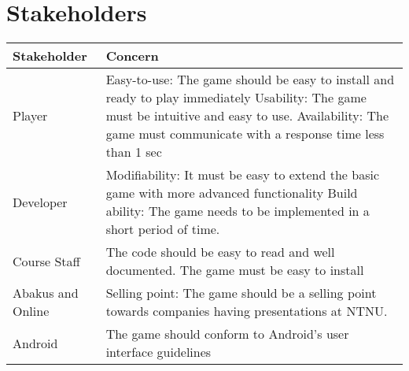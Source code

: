 \section{Stakeholders} 
\label{sec:stakeholders}

\begin{tabular}{|m{}|m{}|}
\hline
Stakeholder & Concern \\ \hline
Player & Easy-to-use: The game should be easy to install and ready to play immediately \newline
Usability: The game must be intuitive and easy to use. \newline
Availability: The game must communicate with a response time less than 1 sec\\ \hline 
Developer & Modifiability: It must be easy to extend the basic game with more advanced functionality \newline
Build ability: The game needs to be implemented in a short period of time.\\ \hline
Course Staff & The code should be easy to read and well documented. The game must be easy to install \\ \hline
Abakus and Online & Selling point: The game should be a selling point towards companies having presentations at NTNU. \\ \hline
Android & The game should conform to Android's user interface guidelines\cite{website:android} \\ \hline %
\end{tabular}

